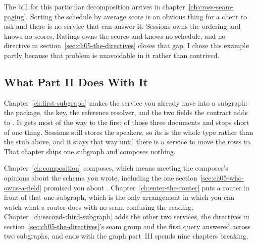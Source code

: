 %
The bill for this particular decomposition arrives in
chapter~\ref{ch:cross-seam-paging}. Sorting the schedule by average score is
an obvious thing for a client to ask and there is no service that can answer
it: Sessions owns the ordering and knows no scores, Ratings owns the scores
and knows no schedule, and no directive in
section~\ref{sec:ch05-the-directives} closes that gap. I chose this example
partly because that problem is unavoidable in it rather than contrived.

\subsection{What Part II Does With It}

%
Chapter~\ref{ch:first-subgraph} makes the service you already have into a
subgraph: the package, the key, the reference resolver, and the two fields the
contract adds to . It gets most of the way to the first of those
three documents and stops short of one thing. Sessions still stores the
speakers, so its  is the whole type rather than the stub above,
and it stays that way until there is a service to move the rows to. That
chapter ships one subgraph and composes nothing.

Chapter~\ref{ch:composition} composes, which means meeting the composer's
opinions about the schema you wrote, including the one
section~\ref{sec:ch05-who-owns-a-field} promised you about .
Chapter~\ref{ch:enter-the-router} puts a router in front of that one subgraph,
which is the only arrangement in which you can watch what a router does with no
seam confusing the reading. Chapter~\ref{ch:second-third-subgraph} adds the
other two services, the directives in
section~\ref{sec:ch05-the-directives}'s seam group and the first query answered
across two subgraphs, and ends with the graph part~III spends nine chapters
breaking.
%
